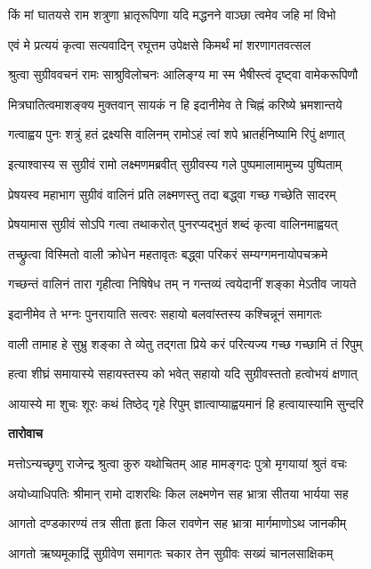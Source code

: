 \twolineshloka
{किं मां घातयसे राम शत्रुणा भ्रातृरूपिणा}
{यदि मद्धनने वाञ्छा त्वमेव जहि मां विभो} %

\twolineshloka
{एवं मे प्रत्ययं कृत्वा सत्यवादिन् रघूत्तम}
{उपेक्षसे किमर्थं मां शरणागतवत्सल} %

\twolineshloka
{श्रुत्वा सुग्रीववचनं रामः साश्रुविलोचनः}
{आलिङ्ग्य मा स्म भैषीस्त्वं दृष्ट्वा वामेकरूपिणौ} %

\twolineshloka
{मित्रघातित्वमाशङ्क्य मुक्तवान् सायकं न हि}
{इदानीमेव ते चिह्नं करिष्ये भ्रमशान्तये} %

\twolineshloka
{गत्वाह्वय पुनः शत्रुं हतं द्रक्ष्यसि वालिनम्}
{रामोऽहं त्वां शपे भ्रातर्हनिष्यामि रिपुं क्षणात्} %

\twolineshloka
{इत्याश्वास्य स सुग्रीवं रामो लक्ष्मणमब्रवीत्}
{सुग्रीवस्य गले पुष्पमालामामुच्य पुष्पिताम्} %

\twolineshloka
{प्रेषयस्व महाभाग सुग्रीवं वालिनं प्रति}
{लक्ष्मणस्तु तदा बद्ध्वा गच्छ गच्छेति सादरम्} %

\twolineshloka
{प्रेषयामास सुग्रीवं सोऽपि गत्वा तथाकरोत्}
{पुनरप्यद्भुतं शब्दं कृत्वा वालिनमाह्वयत्} %

\twolineshloka
{तच्छ्रुत्वा विस्मितो वाली क्रोधेन महतावृतः}
{बद्ध्वा परिकरं सम्यग्गमनायोपचक्रमे} %

\twolineshloka
{गच्छन्तं वालिनं तारा गृहीत्वा निषिषेध तम्}
{न गन्तव्यं त्वयेदानीं शङ्का मेऽतीव जायते} %

\twolineshloka
{इदानीमेव ते भग्नः पुनरायाति सत्वरः}
{सहायो बलवांस्तस्य कश्चिन्नूनं समागतः} %

\twolineshloka
{वाली तामाह हे सुभ्रु शङ्का ते व्येतु तद्गता}
{प्रिये करं परित्यज्य गच्छ गच्छामि तं रिपुम्} %

\twolineshloka
{हत्वा शीघ्रं समायास्ये सहायस्तस्य को भवेत्}
{सहायो यदि सुग्रीवस्ततो हत्वोभयं क्षणात्} %

\twolineshloka
{आयास्ये मा शुचः शूरः कथं तिष्ठेद् गृहे रिपुम्}
{ज्ञात्वाप्याह्वयमानं हि हत्वायास्यामि सुन्दरि} %

\textbf{तारोवाच}

\twolineshloka
{मत्तोऽन्यच्छृणु राजेन्द्र श्रुत्वा कुरु यथोचितम्}
{आह मामङ्गदः पुत्रो मृगयायां श्रुतं वचः} %

\twolineshloka
{अयोध्याधिपतिः श्रीमान् रामो दाशरथिः किल}
{लक्ष्मणेन सह भ्रात्रा सीतया भार्यया सह} %

\twolineshloka
{आगतो दण्डकारण्यं तत्र सीता हृता किल}
{रावणेन सह भ्रात्रा मार्गमाणोऽथ जानकीम्} %

\twolineshloka
{आगतो ऋष्यमूकाद्रिं सुग्रीवेण समागतः}
{चकार तेन सुग्रीवः सख्यं चानलसाक्षिकम्} %


